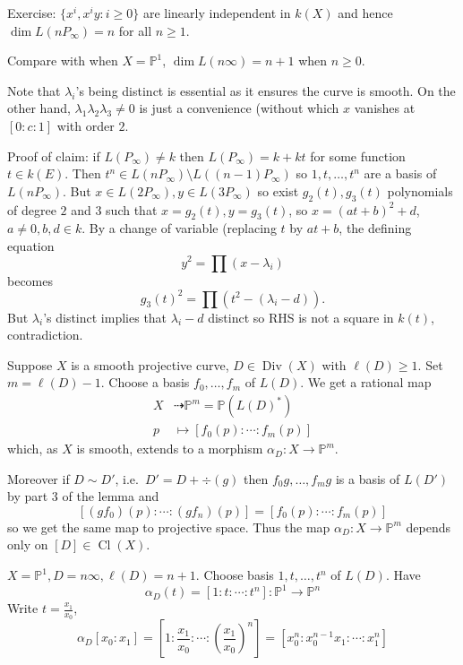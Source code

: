 \documentclass[a4paper]{article}
\DeclareMathOperator{\Cl}{Cl}
\renewcommand*{\P}{\mathbb{P}}
\newcommand{\rational}{\dashrightarrow} %
\DeclareMathOperator{\Div}{Div} %
\begin{document}
\begin{eg}
  Exercise: \(\{x^i, x^iy: i \geq 0\}\) are linearly independent in \(k(X)\) and hence \(\dim L(n P_\infty) = n\) for all \(n \geq 1\).

  Compare with when \(X = \P^1\), \(\dim L(n \infty) = n + 1\) when \(n \geq 0\).

  Note that \(\lambda_i\)'s being distinct is essential as it ensures the curve is smooth. On the other hand, \(\lambda_1\lambda_2\lambda_3 \neq 0\) is just a convenience (without which \(x\) vanishes at \([0:c:1]\) with order \(2\).

  Proof of claim: if \(L(P_\infty) \neq k\) then \(L(P_\infty) = k + kt\) for some function \(t \in k(E)\). Then \(t^n \in L(n P_\infty) \setminus L((n - 1) P_\infty)\) so \(1, t, \dots, t^n\) are a basis of \(L(n P_\infty)\). But \(x \in L(2 P_\infty), y \in L(3P_\infty)\) so exist \(g_2(t), g_3(t)\) polynomials of degree \(2\) and \(3\) such that \(x = g_2(t), y = g_3(t)\), so \(x = (a t + b)^2 + d\), \(a \neq 0, b, d \in k\). By a change of variable (replacing \(t\) by \(a t + b\), the defining equation
  \[
    y^2 = \prod (x - \lambda_i)
  \]
  becomes
  \[
    g_3(t)^2 = \prod (t^2 - (\lambda_i - d)).
  \]
  But \(\lambda_i\)'s distinct implies that \(\lambda_i - d\) distinct so RHS is not a square in \(k(t)\), contradiction.
\end{eg}

Suppose \(X\) is a smooth projective curve, \(D \in \Div (X)\) with \(\ell(D) \geq 1\). Set \(m = \ell(D) - 1\). Choose a basis \(f_0, \dots, f_m\) of \(L(D)\). We get a rational map
\begin{align*}
  X &\rational \P^m = \P(L(D)^*) \\
  p &\mapsto [f_0(p): \cdots : f_m(p)]
\end{align*}
which, as \(X\) is smooth, extends to a morphism \(\alpha_D: X \to \P^m\).

Moreover if \(D \sim D'\), i.e.\ \(D' = D + \div (g)\) then \(f_0g, \dots, f_mg\) is a basis of \(L(D')\) by part 3 of the lemma and
\[
  [(gf_0)(p) : \cdots : (gf_n)(p)] = [f_0(p): \cdots: f_m(p)]
\]
so we get the same map to projective space. Thus the map \(\alpha_D: X \to \P^m\) depends only on \([D] \in \Cl(X)\).

\begin{eg}
  \(X = \P^1, D = n \infty, \ell(D) = n + 1\). Choose basis \(1, t, \dots, t^n\) of \(L(D)\). Have
  \[
    \alpha_D(t) = [1: t: \cdots :t^n]: \P^1 \to \P^n
  \]
  Write \(t = \frac{x_1}{x_0}\),
  \[
    \alpha_D[x_0: x_1] = [1: \frac{x_1}{x_0}: \cdots : \left( \frac{x_1}{x_0} \right)^n] = [x_0^n:x_0^{n - 1} x_1: \cdots : x_1^n]
  \]
\end{eg}
\end{document}
